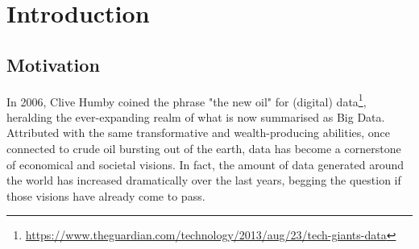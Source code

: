 \documentclass[a4paper,english,twoside,BCOR1.5cm,headsepline,DIV12,appendixprefix,final,12pt]{scrbook}
\newcommand\footnoteurl[1]{\footnote{\scriptsize\url{#1}}}
\begin{document}
\frenchspacing

\mainmatter

\chapter{Introduction}
\label{chap:introduction}

\section{Motivation}
\label{sec:motivation}
In 2006, Clive Humby coined the phrase "the new oil" for (digital) data\footnoteurl{https://www.theguardian.com/technology/2013/aug/23/tech-giants-data}, heralding the ever-expanding realm of what is now summarised as Big Data. Attributed with the same transformative and wealth-producing abilities, once connected to crude oil bursting out of the earth, data has become a cornerstone of economical and societal visions. In fact, the amount of data generated around the world has increased dramatically over the last years, begging the question if those visions have already come to pass. 
\end{document}
